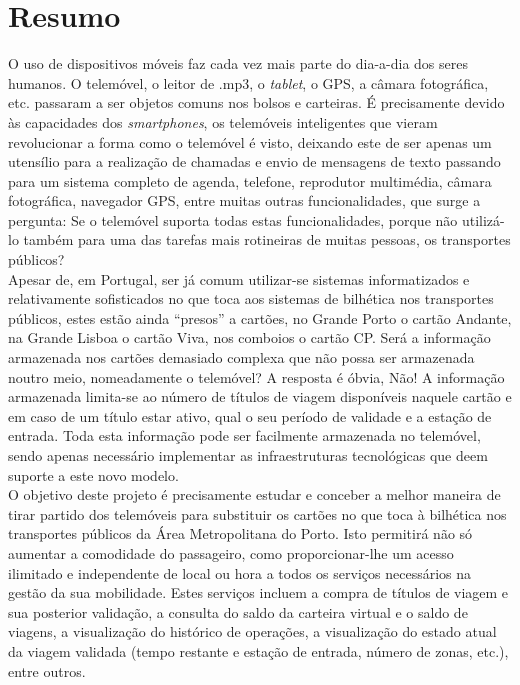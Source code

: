 \chapter*{Resumo}

O uso de dispositivos móveis faz cada vez mais parte do dia-a-dia dos seres humanos. O telemóvel, o leitor de .mp3, o \textit{tablet}, o GPS, a câmara fotográfica, etc. passaram a ser objetos comuns nos bolsos e carteiras. É precisamente devido às capacidades dos \textit{smartphones}, os telemóveis inteligentes que vieram revolucionar a forma como o telemóvel é visto, deixando este de ser apenas um utensílio para a realização de chamadas e envio de mensagens de texto passando para um sistema completo de agenda, telefone, reprodutor multimédia, câmara fotográfica, navegador GPS, entre muitas outras funcionalidades, que surge a pergunta: Se o telemóvel suporta todas estas funcionalidades, porque não utilizá-lo também para uma das tarefas mais rotineiras de muitas pessoas, os transportes públicos?
\\Apesar de, em Portugal, ser já comum utilizar-se sistemas informatizados e relativamente sofisticados no que toca aos sistemas de bilhética nos transportes públicos, estes estão ainda “presos” a cartões, no Grande Porto o cartão Andante, na Grande Lisboa o cartão Viva, nos comboios o cartão CP. Será a informação armazenada nos cartões demasiado complexa que não possa ser armazenada noutro meio, nomeadamente o telemóvel? A resposta é óbvia, Não! A informação armazenada limita-se ao número de títulos de viagem disponíveis naquele cartão e em caso de um título estar ativo, qual o seu período de validade e a estação de entrada. Toda esta informação pode ser facilmente armazenada no telemóvel, sendo apenas necessário implementar as infraestruturas tecnológicas que deem suporte a este novo modelo.
\\O objetivo deste projeto é precisamente estudar e conceber a melhor maneira de tirar partido dos telemóveis para substituir os cartões no que toca à bilhética nos transportes públicos da Área Metropolitana do Porto. Isto permitirá não só aumentar a comodidade do passageiro, como proporcionar-lhe um acesso ilimitado e independente de local ou hora a todos os serviços necessários na gestão da sua mobilidade. Estes serviços incluem a compra de títulos de viagem e sua posterior validação, a consulta do saldo da carteira virtual e o saldo de viagens, a visualização do histórico de operações, a visualização do estado atual da viagem validada (tempo restante e estação de entrada, número de zonas, etc.), entre outros.
